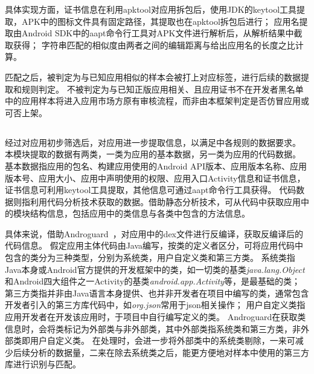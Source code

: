 具体实现方面，证书信息在利用apktool对应用拆包后，使用JDK的keytool工具提取，APK中的图标文件具有固定路径，其提取也在apktool拆包后进行；
应用名提取由Android SDK中的aapt命令行工具对APK文件进行解析后，从解析结果中截取获得；
字符串匹配的相似度由两者之间的编辑距离与给出应用名的长度之比计算。

匹配之后，被判定为与已知应用相似的样本会被打上对应标签，进行后续的数据提取和规则判定。
不被\componentA 判定为与已知正版应用相关、且应用证书不在开发者黑名单中的应用样本将进入应用市场方原有审核流程，而非由本框架判定是否仿冒应用或可否上架。

\subsection{\componentB }

经过\componentA 对应用初步筛选后，\componentB 对应用进一步提取信息，以满足\componentC 中各规则的数据要求。
本模块提取的数据有两类，一类为应用的基本数据，另一类为应用的代码数据。
基本数据指应用的包名、构建应用使用的Android API版本、应用版本名称、应用版本号、应用大小、应用中声明使用的权限、应用入口Activity信息和证书信息，证书信息可利用keytool工具提取，其他信息可通过aapt命令行工具获得。
代码数据则指利用代码分析技术获取的数据。借助静态分析技术，\componentB 可从代码中获取应用中的模块结构信息，包括应用中的类信息与各类中包含的方法信息。

具体来说，\componentB 借助Androguard~\cite{Androguard}，对应用中的dex文件进行反编译，获取反编译后的代码信息。
假定应用主体代码由Java编写，按类的定义者区分，可将应用代码中包含的类分为三种类型，分别为系统类，用户自定义类和第三方类。
系统类指Java本身或Android官方提供的开发框架中的类，如一切类的基类\textit{java.lang.Object}和Android四大组件之一Activity的基类\textit{android.app.Activity}等，是最基础的类；
第三方类指并非由Java语言本身提供、也并非开发者在项目中编写的类，通常包含开发者引入的第三方库代码中，如\textit{org.json}常用于json相关操作；
用户自定义类指应用开发者在开发该应用时，于项目中自行编写定义的类。
Androguard在获取类信息时，会将类标记为外部类与非外部类，其中外部类指系统类和第三方类，非外部类即用户自定义类。
\componentB 在处理时，会进一步将外部类中的系统类剔除，一来可减少后续分析的数据量，二来在除去系统类之后，能更方便地对样本中使用的第三方库进行识别与匹配。

